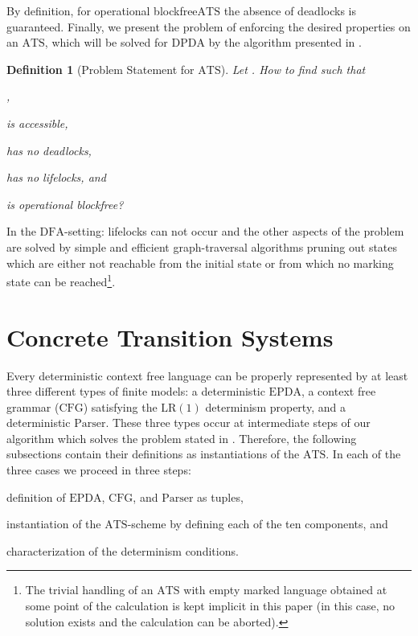 \documentclass[draft]{ifacconf}
\newtheorem{definition}{Definition}
\newcommand{\ATS}{\ensuremath{\mathrm{ATS}}\xspace}
\newcommand{\Parser}{\ensuremath{\mathrm{Parser}}\xspace}
\newcommand{\CFG}{\ensuremath{\mathrm{CFG}}\xspace}
\newcommand{\LR}[1][1]{\ensuremath{\mathrm{LR}(#1)}\xspace}
\newcommand{\DFA}{\ensuremath{\mathrm{DFA}}\xspace}
\newcommand{\EPDA}{\ensuremath{\mathrm{EPDA}}\xspace}
\newcommand{\DPDA}{\ensuremath{\mathrm{DPDA}}\xspace}
\newcommand{\OBF}{operational blockfree\xspace}
\begin{document}
By definition, for \OBF \ATS the absence of deadlocks is guaranteed.
Finally, we present the problem of enforcing the desired properties on an \ATS, which will be solved for \DPDA by the algorithm presented in .

\begin{definition}[Problem Statement for \ATS]\label{def:ATS:problem}
Let .
How to find  such that 
\begin{inparaenum}[(i)]
\item ,
\item  is accessible,
\item  has no deadlocks,
\item  has no lifelocks, and
\item  is \OBF?
\end{inparaenum}
\end{definition}
In the \DFA-setting: lifelocks can not occur and the other aspects of the problem are solved by simple and efficient graph-traversal algorithms pruning out states which are either not reachable from the initial state or from which no marking state can be reached\footnote{The trivial handling of an \ATS with empty marked language obtained at some point of the calculation is kept implicit in this paper (in this case, no solution exists and the calculation can be aborted).}.

\section{Concrete Transition Systems}\label{sect:CTS}
Every deterministic context free language can be properly represented by at least three different types of finite models: a deterministic \EPDA, a context free grammar (\CFG) satisfying the \LR determinism property, and a deterministic \Parser.
These three types occur at intermediate steps of our algorithm which solves the problem stated in .
Therefore, the following subsections contain their definitions as instantiations of the \ATS.
In each of the three cases we proceed in three steps:
\begin{inparaenum}
\item definition of \EPDA, \CFG, and \Parser as tuples,
\item instantiation of the \ATS-scheme by defining each of the ten components, and
\item characterization of the determinism conditions.
\end{inparaenum}
\end{document}
